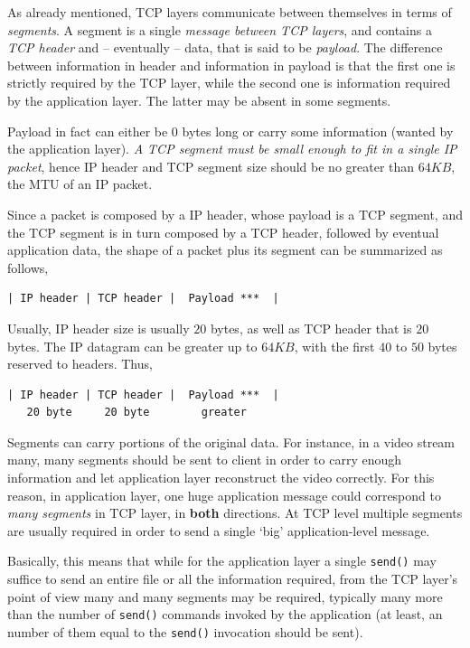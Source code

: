\documentclass[10pt]{extbook}
\begin{document}
As already mentioned, TCP layers communicate between themselves in terms of
\emph{segments}. A segment is a single \emph{message between TCP layers}, and
contains a \emph{TCP header} and \--- eventually \--- data, that is said to be
\emph{payload}. The difference between information in header and information in
payload is that the first one is strictly required by the TCP layer, while the
second one is information required by the application layer. The latter may be
absent in some segments.

Payload in fact can either be $0$ bytes long or carry some information (wanted
by the application layer). \emph{A TCP segment must be small enough to fit in a
single IP packet}, hence IP header and TCP segment size should be no greater
than $64KB$, the MTU of an IP packet.

Since a packet is composed by a IP header, whose payload is a TCP segment, and the
TCP segment is in turn composed by a TCP header, followed by eventual
application data, the shape of a packet plus its segment can be summarized as
follows,

\begin{verbatim}
| IP header | TCP header |  Payload ***  |
\end{verbatim}

Usually, IP header size is usually $20$ bytes, as well as TCP
header that is $20$ bytes. The IP datagram can be greater up to $64KB$, with
the first $40$ to $50$ bytes reserved to headers. Thus,

\begin{verbatim}
| IP header | TCP header |  Payload ***  |
   20 byte     20 byte        greater
\end{verbatim}

Segments can carry portions of the original data. For instance, in a video
stream many, many segments should be sent to client in order to carry enough
information and let application layer reconstruct the video correctly. For
this reason, in application layer, one huge application message could correspond to
\emph{many segments} in TCP layer, in \textbf{both} directions. At TCP
level multiple segments are usually required in order to send a single
`big' application-level message.

Basically, this means that while for the application layer a single
\texttt{send()} may suffice to send an entire file or all the information
required, from the TCP layer's point of view many and many segments may be
required, typically many more than the number of \texttt{send()} commands
invoked by the application (at least, an number of them equal to the
\texttt{send()} invocation should be sent).
\end{document}
